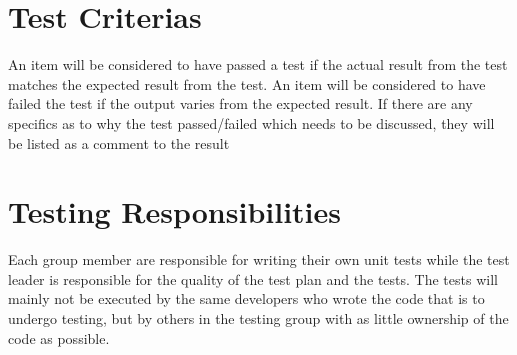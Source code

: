 \section{Test Criterias}
An item will be considered to have passed a test if the actual result from the test matches the expected result from the test. An item will be considered to have failed the test if the output varies from the expected result. If there are any specifics as to why the test passed/failed which needs to be discussed, they will be listed as a comment to the result

\section{Testing Responsibilities}
Each group member are responsible for writing their own unit tests while the test leader is responsible for the quality of the test plan and the tests. The tests will mainly not be executed by the same developers who wrote the code that is to undergo testing, but by others in the testing group with as little ownership of the code as possible. 


